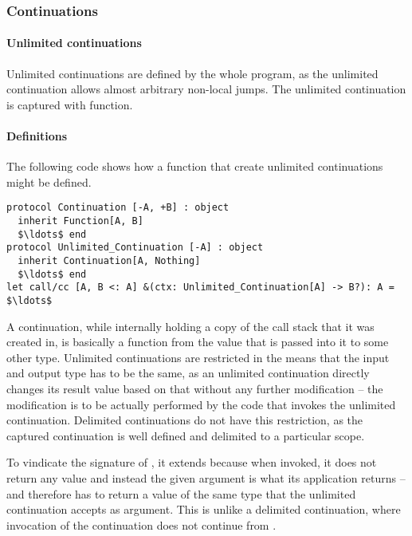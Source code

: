 \subsubsection{Continuations}
\label{sec:continuations}






\paragraph{Unlimited continuations}

Unlimited continuations are defined by the whole program, as the unlimited continuation allows almost arbitrary non-local jumps. The unlimited continuation is captured with  function. 

\paragraph{Definitions}
The following code shows how a function that create unlimited continuations might be defined. 
\begin{lstlisting}
protocol Continuation [-A, +B] : object 
  inherit Function[A, B] 
  $\ldots$ end
protocol Unlimited_Continuation [-A] : object 
  inherit Continuation[A, Nothing] 
  $\ldots$ end
let call/cc [A, B <: A] &(ctx: Unlimited_Continuation[A] -> B?): A = $\ldots$
\end{lstlisting}

A continuation, while internally holding a copy of the call stack that it was created in, is basically a function from the value that is passed into it to some other type. Unlimited continuations are restricted in the means that the input and output type has to be the same, as an unlimited continuation directly changes its result value based on that without any further modification -- the modification is to be actually performed by the code that invokes the unlimited continuation. Delimited continuations do not have this restriction, as the captured continuation is well defined and delimited to a particular scope. 

To vindicate the signature of , it extends  because when invoked, it does not return any value and instead the given argument is what its  application returns -- and therefore  has to return a value of the same type that the unlimited continuation accepts as argument. This is unlike a delimited continuation, where invocation of the continuation does not continue from . 

